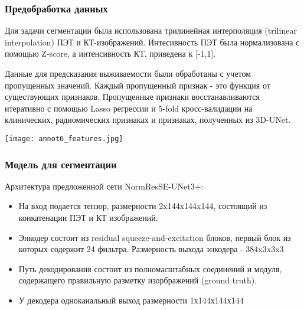 \subsubsection*{Предобработка данных}
Для задачи сегментации была использована трилинейная интерполяция (trilinear interpolation) ПЭТ и КТ-изображений.
Интесивность ПЭТ была нормализована с помощью Z-score, а интенсивность КТ, 
приведена к [-1,1]. \par
Данные для предсказания выживаемости были обработаны с учетом пропущенных значений. Каждый пропущенный признак - 
это функция от существующих признаков. Пропущенные признаки восстанавливаются итеративно
с помощью Lasso регрессии и 5-fold кросс-валидации на клинических, радиомических признаках и признаках, полученных из 3D-UNet.



\begin{minipage}{1.0\linewidth}
    \begin{center}
    
    \texttt{[image: annot6\_features.jpg]} \\
\end{center}
\end{minipage}


\subsubsection*{Модель для сегментации}
Архитектура предложенной сети NormResSE-UNet3+: 
\begin{itemize}
    \item На вход подается тензор, размерности 2x144x144x144, состоящий из конкатенации
    ПЭТ и КТ изображений.
    \item Энкодер состоит из residual squeeze-and-excitation блоков, первый блок из которых 
    содержит 24 фильтра. Размерность выхода энкодера - 384x3x3x3
    \item Путь декодирования состоит из полномасштабных соединений и модуля, содержащего 
    правильную разметку изорбражений (ground truth).
    \item У декодера одноканальный выход размерности 1х144х144х144
\end{itemize}



